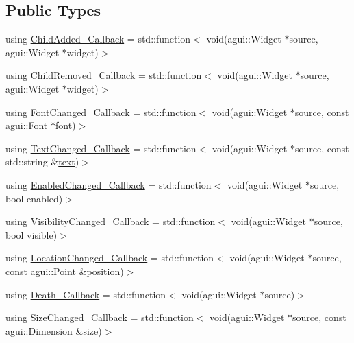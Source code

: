 \subsection*{Public Types}
\begin{DoxyCompactItemize}
\item 
using \mbox{\hyperlink{classec_1_1_generic_widget_listener_ae374d6d8d2ca9eac9e362a2e587b6ae5}{Child\+Added\+\_\+\+Callback}} = std\+::function$<$ void(agui\+::\+Widget $\ast$source, agui\+::\+Widget $\ast$widget)$>$
\item 
using \mbox{\hyperlink{classec_1_1_generic_widget_listener_a8b00b7a94ee023680c4af876a5b5a4a5}{Child\+Removed\+\_\+\+Callback}} = std\+::function$<$ void(agui\+::\+Widget $\ast$source, agui\+::\+Widget $\ast$widget)$>$
\item 
using \mbox{\hyperlink{classec_1_1_generic_widget_listener_a996d1f52cd8a7b2b68b65956df295fe4}{Font\+Changed\+\_\+\+Callback}} = std\+::function$<$ void(agui\+::\+Widget $\ast$source, const agui\+::\+Font $\ast$font)$>$
\item 
using \mbox{\hyperlink{classec_1_1_generic_widget_listener_a1aca43f34a5ccb594026e6acda4236f5}{Text\+Changed\+\_\+\+Callback}} = std\+::function$<$ void(agui\+::\+Widget $\ast$source, const std\+::string \&\mbox{\hyperlink{namespaceec_a0bdee24285d69deca899e166b29c0150}{text}})$>$
\item 
using \mbox{\hyperlink{classec_1_1_generic_widget_listener_aa45e97274cfc832de2b027f94aeaa4c5}{Enabled\+Changed\+\_\+\+Callback}} = std\+::function$<$ void(agui\+::\+Widget $\ast$source, bool enabled)$>$
\item 
using \mbox{\hyperlink{classec_1_1_generic_widget_listener_aff589de061ea44ef90ab0fb63ad92477}{Visibility\+Changed\+\_\+\+Callback}} = std\+::function$<$ void(agui\+::\+Widget $\ast$source, bool visible)$>$
\item 
using \mbox{\hyperlink{classec_1_1_generic_widget_listener_ace866e0f10178009a4cdb4868f183316}{Location\+Changed\+\_\+\+Callback}} = std\+::function$<$ void(agui\+::\+Widget $\ast$source, const agui\+::\+Point \&position)$>$
\item 
using \mbox{\hyperlink{classec_1_1_generic_widget_listener_a9fbdf208fb605a8f9bcaf6f84246118f}{Death\+\_\+\+Callback}} = std\+::function$<$ void(agui\+::\+Widget $\ast$source)$>$
\item 
using \mbox{\hyperlink{classec_1_1_generic_widget_listener_aa47779ac982662cd4466132fa13fae68}{Size\+Changed\+\_\+\+Callback}} = std\+::function$<$ void(agui\+::\+Widget $\ast$source, const agui\+::\+Dimension \&size)$>$

\end{DoxyCompactItemize}

